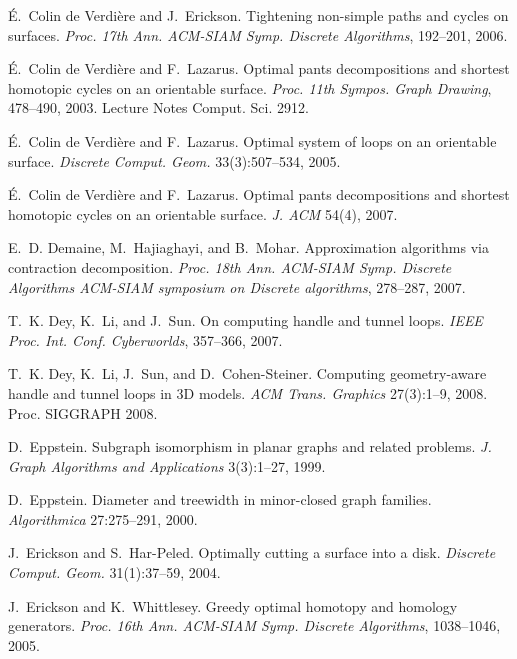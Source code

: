 \documentclass{sig-alternate}
\begin{document}
\begin{thebibliography}{10}
{\'E}.~{Colin de Verdi{\`e}re} and J.~Erickson.
\newblock Tightening non-simple paths and cycles on surfaces.
\newblock \emph{Proc. 17th Ann. ACM-SIAM Symp. Discrete Algorithms}, 192--201,
  2006.

{\'E}.~{Colin de Verdi{\`e}re} and F.~Lazarus.
\newblock Optimal pants decompositions and shortest homotopic cycles on an
  orientable surface.
\newblock \emph{Proc. 11th Sympos. Graph Drawing}, 478--490, 2003. Lecture
  Notes Comput. Sci. 2912.

{\'E}.~{Colin de Verdi{\`e}re} and F.~Lazarus.
\newblock Optimal system of loops on an orientable surface.
\newblock \emph{Discrete Comput. Geom.} 33(3):507--534, 2005.

{\'E}.~{Colin de Verdi{\`e}re} and F.~Lazarus.
\newblock Optimal pants decompositions and shortest homotopic cycles on an
  orientable surface.
\newblock \emph{J. ACM} 54(4), 2007.

E.~D. Demaine, M.~Hajiaghayi, and B.~Mohar.
\newblock Approximation algorithms via contraction decomposition.
\newblock \emph{Proc. 18th Ann. ACM-SIAM Symp. Discrete Algorithms ACM-SIAM
  symposium on Discrete algorithms}, 278--287, 2007.

T.~K. Dey, K.~Li, and J.~Sun.
\newblock On computing handle and tunnel loops.
\newblock \emph{IEEE Proc. Int. Conf. Cyberworlds}, 357--366, 2007.

T.~K. Dey, K.~Li, J.~Sun, and D.~Cohen-Steiner.
\newblock Computing geometry-aware handle and tunnel loops in {3D} models.
\newblock \emph{ACM Trans. Graphics} 27(3):1--9, 2008.
\newblock Proc. SIGGRAPH 2008.

D.~Eppstein.
\newblock Subgraph isomorphism in planar graphs and related problems.
\newblock \emph{J. Graph Algorithms and Applications} 3(3):1--27, 1999.

D.~Eppstein.
\newblock Diameter and treewidth in minor-closed graph families.
\newblock \emph{Algorithmica} 27:275--291, 2000.

J.~Erickson and S.~Har-Peled.
\newblock Optimally cutting a surface into a disk.
\newblock \emph{Discrete Comput. Geom.} 31(1):37--59, 2004.

J.~Erickson and K.~Whittlesey.
\newblock Greedy optimal homotopy and homology generators.
\newblock \emph{Proc. 16th Ann. ACM-SIAM Symp. Discrete Algorithms},
  1038--1046, 2005.


\end{thebibliography}
\end{document}
